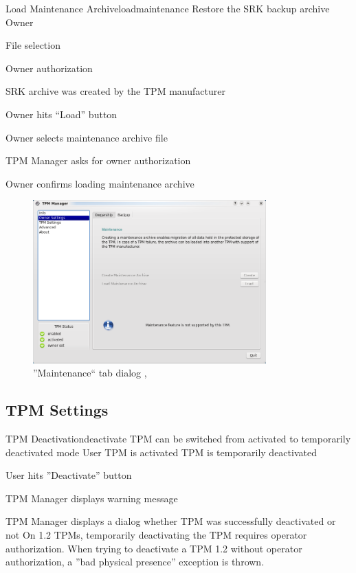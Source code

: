 \documentclass[
  american        %
]{sirrixreport}
\begin{document}
\begin{usecase}{Load Maintenance Archive}{loadmaintenance}
\ucdesc Restore the SRK backup archive
\ucactors  Owner
\ucinclude 
   \begin{compactitem}
      \item File selection
      \item Owner authorization
   \end{compactitem}
\ucprecond SRK archive was created by the TPM manufacturer
\ucnormal 
 \item Owner hits ``Load'' button
 \item Owner selects maintenance archive file
 \item TPM Manager asks for owner authorization
 \item Owner confirms loading maintenance archive
\ucendflow
\end{usecase}

\begin{figure}[h]
 \centering
 \includegraphics[width=0.8\textwidth]{images/tpm_backup}
 \caption{''Maintenance`` tab dialog , }
\end{figure}
\clearpage

\subsection{TPM Settings}

\begin{usecase}{TPM Deactivation}{deactivate}
\ucdesc TPM can be switched from activated to temporarily deactivated mode
\ucactors  User
\ucprecond TPM is activated
\ucpostcond TPM is temporarily deactivated
\ucnormal 
 \item User hits ''Deactivate'' button
 \item TPM Manager displays warning message
 \item TPM Manager displays a dialog whether TPM was successfully deactivated or not 
\ucendflow
\ucnote On 1.2 TPMs, temporarily deactivating the TPM requires operator authorization. When trying to deactivate a TPM 1.2 without operator authorization, a ”bad physical presence” exception is thrown.
\end{usecase}
\clearpage
\end{document}
